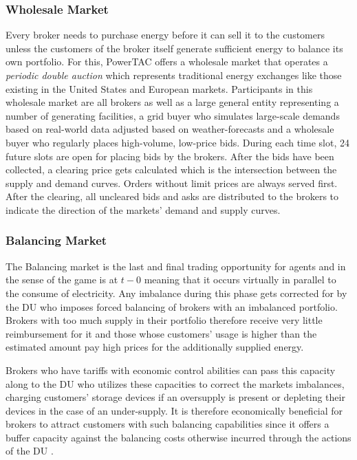 \subsubsection{Wholesale Market}
Every broker needs to purchase energy before it can sell it to the customers unless the customers of the broker itself
generate sufficient energy to balance its own portfolio. For this, \ac{PowerTAC} offers a wholesale market that operates
a \emph{periodic double auction} which represents traditional energy exchanges like those existing in the United States
and European markets. Participants in this wholesale market are all brokers as well as a large general entity
representing a number of generating facilities, a grid buyer who simulates large-scale demands based on real-world data
adjusted based on weather-forecasts and a wholesale buyer who regularly places high-volume, low-price bids. During each
time slot, 24 future slots are open for placing bids by the brokers. After the bids have been collected, a clearing
price gets calculated which is the intersection between the supply and demand curves. Orders without limit prices are
always served first. After the clearing, all uncleared bids and asks are distributed to the brokers to indicate the
direction of the markets' demand and supply curves.

\subsubsection{Balancing Market} The Balancing market is the last and final trading opportunity for agents and in the
sense of the game is at $t-0$ meaning that it occurs virtually in parallel to the consume of electricity. Any imbalance
during this phase gets corrected for by the \ac{DU} who imposes forced balancing of brokers with an imbalanced
portfolio. Brokers with too much supply in their portfolio therefore receive very little reimbursement for it and those
whose customers' usage is higher than the estimated amount pay high prices for the additionally supplied energy.

Brokers who have tariffs with economic control abilities can pass this capacity along to the \ac{DU} who utilizes these
capacities to correct the markets imbalances, charging customers' storage devices if an oversupply is present or
depleting their devices in the case of an under-supply. It is therefore economically beneficial for brokers to attract
customers with such balancing capabilities since it offers a buffer capacity against the balancing costs otherwise
incurred through the actions of the \ac{DU} \citep[p.5]{ketter2018powertac} .





